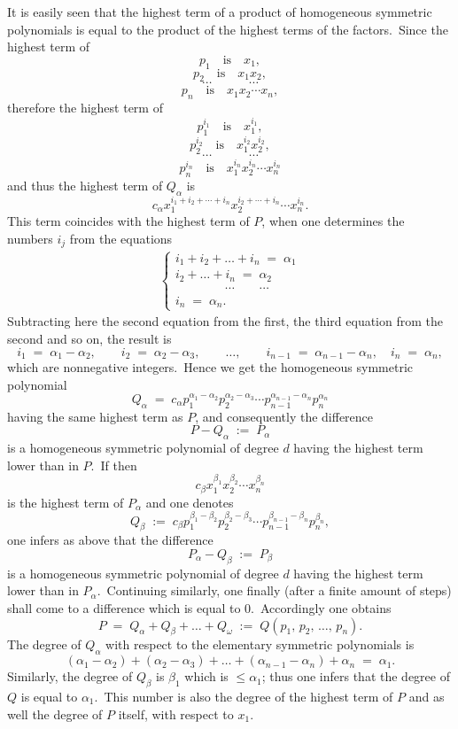 \documentclass[12pt]{article}
\theoremstyle{definition}
\begin{document}
It is easily seen that the highest term of a product of homogeneous symmetric polynomials is equal to the product of the highest terms of the factors.\, Since the highest term of
$$p_1 \quad\mbox{is}\quad x_1,$$
$$p_2 \quad\mbox{is}\quad x_1x_2,$$
$$\cdots \qquad\quad \cdots$$
$$p_n \quad\mbox{is}\quad x_1x_2\!\cdots\!x_n,$$
therefore the highest term of
$$p_1^{i_1} \quad\mbox{is}\quad x_1^{i_1},$$
$$p_2^{i_2} \quad\mbox{is}\quad x_1^{i_2}x_2^{i_2},$$
$$\cdots \qquad\quad \cdots$$
$$p_n^{i_n} \quad\mbox{is}\quad x_1^{i_n}x_2^{i_n}\!\cdots\!x_n^{i_n}$$
and thus the highest term of $Q_\alpha$ is 
$$c_\alpha x_1^{i_1+i_2+\cdots+i_n}x_2^{i_2+\cdots+i_n}\!\cdots\!x_n^{i_n}.$$
This term coincides with the highest term of $P$, when one determines the numbers $i_j$ from the equations
\begin{align*}
\begin{cases}
i_1+i_2+\ldots+i_n \;=\; \alpha_1 \\
    i_2+\ldots+i_n \;=\; \alpha_2 \\
\qquad\qquad\cdots\qquad  \cdots \\
               i_n \;=\; \alpha_n.
 \end{cases}
\end{align*}
Subtracting here the second equation from the first, the third equation from the second and so on, the result is
$$i_1 \;=\; \alpha_1\!-\!\alpha_2, \qquad i_2 \;=\; 
\alpha_2\!-\!\alpha_3, \qquad\ldots, \qquad 
i_{n-1} \;=\; \alpha_{n-1}\!-\!\alpha_n, \quad i_n \;=\; \alpha_n,$$
which are nonnegative integers.\, Hence we get the homogeneous symmetric polynomial 
$$Q_\alpha \;=\; 
c_\alpha p_1^{\alpha_1-\alpha_2}p_2^{\alpha_2-\alpha_3}\!\cdots\!p_{n-1}^{\alpha_{n-1}-\alpha_n}p_n^{\alpha_n}$$
having the same highest term as $P$, and consequently the difference
$$P\!-\!Q_\alpha \;:=\; P_\alpha$$
is a homogeneous symmetric polynomial of degree $d$ having the highest term lower than in $P$.\, If then
$$c_\beta x_1^{\beta_1}x_2^{\beta_2}\!\cdots\!x_n^{\beta_n}$$
is the highest term of $P_\alpha$ and one denotes
$$Q_\beta \;:=\; 
c_\beta p_1^{\beta_1-\beta_2}p_2^{\beta_2-\beta_3}\!\cdots\!p_{n-1}^{\beta_{n-1}-\beta_n}p_n^{\beta_n},$$
one infers as above that the difference
$$P_\alpha\!-\!Q_\beta \;:=\; P_\beta$$
is a homogeneous symmetric polynomial of degree $d$ having the highest term lower than in $P_\alpha$.\, Continuing similarly, one finally (after a finite amount of steps) shall come to a difference which is equal to 0.\, Accordingly one obtains
$$P \;=\; Q_\alpha+Q_\beta+\ldots+Q_\omega \;:=\; Q(p_1,\,p_2,\,\ldots,\,p_n).$$
The degree of $Q_\alpha$ with respect to the elementary symmetric polynomials is
$$(\alpha_1\!-\!\alpha_2)+(\alpha_2\!-\!\alpha_3)+\ldots+(\alpha_{n-1}\!-\!\alpha_n)+\alpha_n \;=\; \alpha_1.$$
Similarly, the degree of $Q_\beta$ is $\beta_1$ which is $\le \alpha_1$; thus one infers that the degree of $Q$ is equal to $\alpha_1$.\, This number is also the degree of the highest term of $P$ and as well the degree of $P$ itself, with respect to $x_1$.  
\end{document}
